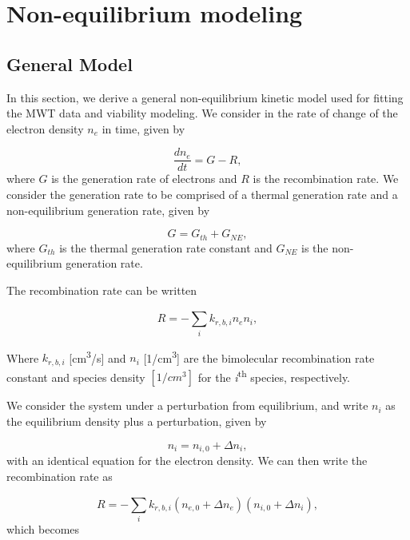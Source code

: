 \section{Non-equilibrium modeling}

\subsection{General Model}

In this section, we derive a general non-equilibrium kinetic model used for fitting the MWT data and viability modeling. We consider in the rate of change of the electron density \(n_{e}\) in time, given by

\begin{equation}
  \label{eq:start_deqn}
\frac{dn_{e}}{dt} = G - R,
\end{equation}
where \(G\) is the generation rate of electrons and \(R\) is the recombination rate. We consider the generation rate to be comprised of a thermal generation rate and a non-equilibrium generation rate, given by

\begin{equation}
  G = G_{th} + G_{NE},
\end{equation}
where \(G_{th}\) is the thermal generation rate constant and \(G_{NE}\) is the non-equilibrium generation rate. 

The recombination rate can be written

\begin{equation}
  R = - \sum_{i}^{}k_{r, b, i}n_{e}n_{i},
\end{equation}

Where $k_{r, b, i}$ [\unit{\centi\meter^3/\second}] and $n_i$ [\unit{1/\centi\meter^3}] are the bimolecular recombination rate constant and species density $[1/cm^3]$ for the \emph{i}\textsuperscript{th} species, respectively. 

We consider the system under a perturbation from equilibrium, and write $n_i$ as the equilibrium density plus a perturbation, given by

\begin{equation}
  n_{i} = n_{i,0} + \Delta n_{i},
\end{equation}
with an identical equation for the electron density. We can then write the recombination rate as

\begin{equation}
  R = - \sum_{i}^{}k_{r, b, i}(n_{e,0} + \Delta n_{e})(n_{i,0} + \Delta n_{i}),
\end{equation}
which becomes

